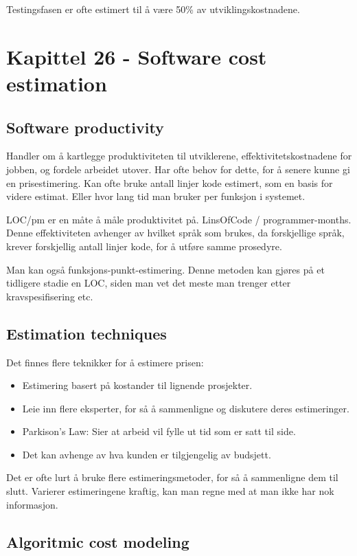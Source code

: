 \documentclass[11pt]{article}
\begin{document}
   Testingsfasen er ofte estimert til å være 50\% av utviklingskostnadene.
\section{Kapittel 26 - Software cost estimation}
\label{sec-10}
\subsection{Software productivity}
\label{sec-10.1}

   Handler om å kartlegge produktiviteten til utviklerene, effektivitetskostnadene 
   for jobben, og fordele arbeidet utover. Har ofte behov for dette, for å senere 
   kunne gi en prisestimering. Kan ofte bruke antall linjer kode estimert, som en basis 
   for videre estimat. Eller hvor lang tid man bruker per funksjon i systemet. 

   LOC/pm er en måte å måle produktivitet på. LinsOfCode / programmer-months. 
   Denne effektiviteten avhenger av hvilket språk som brukes, da forskjellige språk, 
   krever forskjellig antall linjer kode, for å utføre samme prosedyre.

   Man kan også funksjons-punkt-estimering. Denne metoden kan gjøres på et tidligere 
   stadie en LOC, siden man vet det meste man trenger etter kravspesifisering etc.
\subsection{Estimation techniques}
\label{sec-10.2}

   Det finnes flere teknikker for å estimere prisen:

\begin{itemize}
\item Estimering basert på kostander til lignende prosjekter.
\item Leie inn flere eksperter, for så å sammenligne og diskutere deres estimeringer.
\item Parkison's Law: Sier at arbeid vil fylle ut tid som er satt til side.
\item Det kan avhenge av hva kunden er tilgjengelig av budsjett.
\end{itemize}

   Det er ofte lurt å bruke flere estimeringsmetoder, 
   for så å sammenligne dem til slutt. Varierer estimeringene kraftig, 
   kan man regne med at man ikke har nok informasjon.
\subsection{Algoritmic cost modeling}
\label{sec-10.3}
\end{document}
